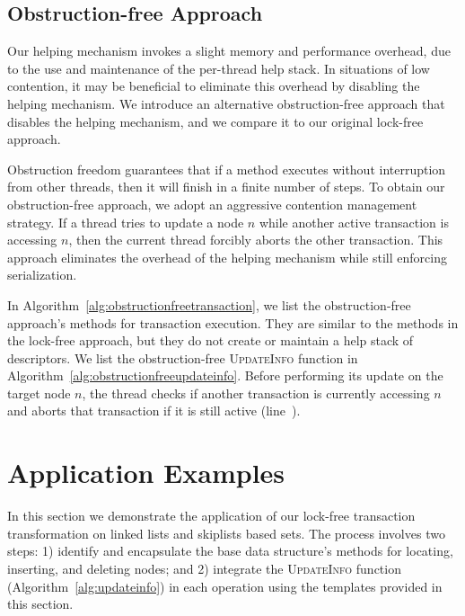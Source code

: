 \documentclass{sig-alternate-05-2015}
\begin{document}
\subsection{Obstruction-free Approach}
Our helping mechanism invokes a slight memory and performance overhead, due to the use and maintenance of the per-thread help stack. In situations of low contention, it may be beneficial to eliminate this overhead by disabling the helping mechanism. We introduce an alternative obstruction-free approach that disables the helping mechanism, and we compare it to our original lock-free approach.

Obstruction freedom guarantees that if a method executes without interruption from other threads, then it will finish in a finite number of steps.
To obtain our obstruction-free approach, we adopt an aggressive contention management strategy.
If a thread tries to update a node $n$ while another active transaction is accessing $n$, then the current thread forcibly aborts the other transaction.
This approach eliminates the overhead of the helping mechanism while still enforcing serialization.

In Algorithm~\ref{alg:obstructionfreetransaction}, we list the obstruction-free approach's methods for transaction execution. They are similar to the methods in the lock-free approach, but they do not create or maintain a help stack of descriptors. We list the obstruction-free \textsc{UpdateInfo} function in Algorithm~\ref{alg:obstructionfreeupdateinfo}. Before performing its update on the target node $n$, the thread checks if another transaction is currently accessing $n$ and aborts that transaction if it is still active (line~).


\section{Application Examples}
\label{sec:application}
In this section we demonstrate the application of our lock-free transaction transformation on linked lists and skiplists based sets. 
The process involves two steps: 1) identify and encapsulate the base data structure's methods for locating, inserting, and deleting nodes; and 2) integrate the \textsc{UpdateInfo} function (Algorithm~\ref{alg:updateinfo}) in each operation using the templates provided in this section.
\end{document}
